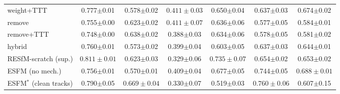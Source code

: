 \documentclass[10pt,twocolumn,letterpaper]{article}
\begin{document}
\begin{table}[h]
\begin{tabular}{@{}lcccccc@{}}
weight+TTT   & 0.777$\pm$0.01 & 0.578$\pm$0.02 & $\mathbf{0.411\pm0.03}$ & 0.650$\pm$0.04 & 0.637$\pm$0.03 & 0.674$\pm$0.02\\
remove       & 0.755$\pm$0.00 & 0.623$\pm$0.02 & $\mathbf{0.411\pm0.07}$ & 0.636$\pm$0.06 & 0.577$\pm$0.05 & 0.584$\pm$0.01\\
remove+TTT   & 0.748$\pm$0.00 & 0.638$\pm$0.02 & 0.388$\pm$0.03 & 0.634$\pm$0.06 & 0.578$\pm$0.05 & 0.581$\pm$0.02\\
hybrid       & 0.760$\pm$0.01 & 0.573$\pm$0.02 & 0.399$\pm$0.04 & 0.603$\pm$0.05 & 0.637$\pm$0.03 & 0.644$\pm$0.01\\
RESfM-scratch (sup.) & $\mathbf{0.811\pm0.01}$ & 0.623$\pm$0.03 & 0.329$\pm$0.06 & $\mathbf{0.735\pm0.07}$ & 0.654$\pm$0.02 & 0.653$\pm$0.02\\
ESFM (no mech.) & 0.756$\pm$0.01 & 0.570$\pm$0.01 & 0.409$\pm$0.04 & 0.677$\pm$0.05 & 0.744$\pm$0.05 & $\mathbf{0.688\pm0.01}$\\
ESFM$^{\ast}$ (clean tracks) & 0.790$\pm$0.05 & $\mathbf{0.669\pm0.04}$ & 0.330$\pm$0.07 & 0.519$\pm$0.03 & $\mathbf{0.760\pm0.06}$ & 0.607$\pm$0.15\\
\bottomrule
\end{tabular}
\end{table}
\end{document}
